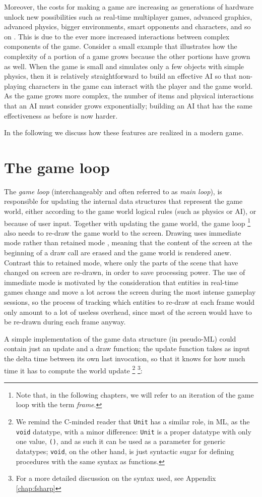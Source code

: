 Moreover, the costs for making a game are increasing as generations of hardware unlock new possibilities such as real-time multiplayer games, advanced graphics, advanced physics, bigger environments, smart opponents and characters, and so on \cite{CHAPTER_1_EXPONENTIAL_COST_OF_GAMEDEV}. This is due to the ever more increased interactions between complex components of the game. Consider a small example that illustrates how the complexity of a portion of a game grows because the other portions have grown as well. When the game is small and simulates only a few objects with simple physics, then it is relatively straightforward to build an effective AI so that non-playing characters in the game can interact with the player and the game world. As the game grows more complex, the number of items and physical interactions that an AI must consider grows exponentially; building an AI that has the same effectiveness as before is now harder.

In the following we discuss how these features are realized in a modern game.

\section{The game loop}
The \textit{game loop} (interchangeably and often referred to as \textit{main loop}), is responsible for updating the internal data structures that represent the game world, either according to the game world logical rules (such as physics or AI), or because of user input. Together with updating the game world, the game loop \footnote{Note that, in the following chapters, we will refer to an iteration of the game loop with the term \textit{frame}.} also needs to re-draw the game world to the screen. Drawing uses immediate mode rather than retained mode \cite{CHAPTER_2_RETAINED_VS_IMMEDIATE_MODE}, meaning that the content of the screen at the beginning of a draw call are erased and the game world is rendered anew. Contrast this to retained mode, where only the parts of the scene that have changed on screen are re-drawn, in order to save processing power. The use of immediate mode is motivated by the consideration that entities in real-time games change and move a lot across the screen during the most intense gameplay sessions, so the process of tracking which entities to re-draw at each frame would only amount to a lot of useless overhead, since most of the screen would have to be re-drawn during each frame anyway.

A simple implementation of the game data structure (in pseudo-ML) could contain just an update and a draw function; the update function takes as input the delta time between its own last invocation, so that it knows for how much time it has to compute the world update \footnote{We remind the C-minded reader that \texttt{Unit} has a similar role, in ML, as the \texttt{void} datatype, with a minor difference: \texttt{Unit} is a proper datatype with only one value, \texttt{()}, and as such it can be used as a parameter for generic datatypes; \texttt{void}, on the other hand, is just syntactic sugar for defining procedures with the same syntax as functions.} \footnote{For a more detailed discussion on the syntax used, see Appendix \ref{chap:fsharp}}:

